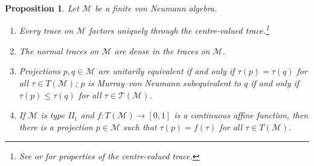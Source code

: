 \documentclass[a4paper,11pt]{amsart}
\newtheorem{proposition}[theorem]{Proposition}
\theoremstyle{definition}
\numberwithin{equation}{section}
\numberwithin{theorem}{section}
\newcommand{\M}{\mathcal{M}}
\begin{document}
 
\begin{proposition}\label{prop:TracesFiniteVNAS}
Let $\mathcal M$ be a finite von Neumann algebra.
\begin{enumerate}
\item Every trace on $\mathcal M$ factors uniquely through the centre-valued trace.\label{prop:TracesFiniteVNAS.1}\footnote{See \cite[Theorem V.2.6]{Tak79} or \cite[Theorem 8.2.8]{KadisonRingrose.2} for properties of the centre-valued trace.}
    \item The normal traces on $\mathcal M$ are dense in the traces on $\mathcal M$.\label{prop:TracesFiniteVNAS.2}
    \item Projections $p,q\in\mathcal M$ are unitarily equivalent if and only if $\tau(p)=\tau(q)$ for all $\tau\in T(\mathcal M)$; $p$ is Murray--von Neumann subequivalent to $q$ if and only if $\tau(p)\leq\tau(q)$ for all $\tau\in\mathcal T(\mathcal M)$.\label{prop:TracesFiniteVNAS.3}
    \item If $\mathcal M$ is type {\rm II}$_1$ and $f \colon T(\M) \rightarrow [0, 1]$ is a continuous affine function, then there is a projection $p \in \M$ such that $\tau(p) = f(\tau)$ for all $\tau \in T(\M)$.\label{prop:TracesFiniteVNAS.4}
\end{enumerate}
\end{proposition}
\end{document}

